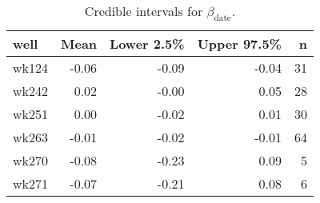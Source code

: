 \begin{table}[ht]
\centering
\begin{tabular}{lrrrr}
  \hline
well & Mean & Lower 2.5\% & Upper 97.5\% & n \\ 
  \hline
wk124 & -0.06 & -0.09 & -0.04 &  31 \\ 
  wk242 & 0.02 & -0.00 & 0.05 &  28 \\ 
  wk251 & 0.00 & -0.02 & 0.01 &  30 \\ 
  wk263 & -0.01 & -0.02 & -0.01 &  64 \\ 
  wk270 & -0.08 & -0.23 & 0.09 &   5 \\ 
  wk271 & -0.07 & -0.21 & 0.08 &   6 \\ 
   \hline
\end{tabular}
\caption{Credible intervals for $\beta_\text{date}$.} 
\label{tab:beta_date}
\end{table}
